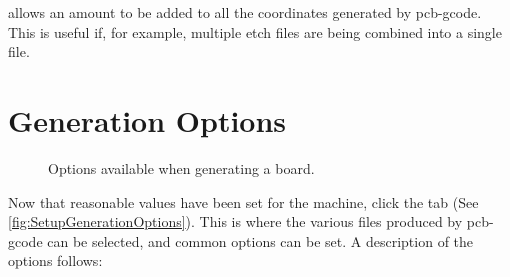 \documentclass[11pt]{book}
\begin{document}
 allows an amount to be added to all the coordinates generated by pcb-gcode. This is useful if, for example, multiple etch files are being combined into a single file.

%
%
\newpage
\section{Generation Options}\label{sec:GenerationOptions}

\begin{figure}
	\caption{Options available when generating a board.}
	\label{fig:SetupGenerationOptions}
\end{figure}

Now that reasonable values have been set for the machine, click the  tab (See \figurename \vref{fig:SetupGenerationOptions}). This is where the various files produced by pcb-gcode can be selected, and common options can be set. A description of the options follows:
\end{document}
